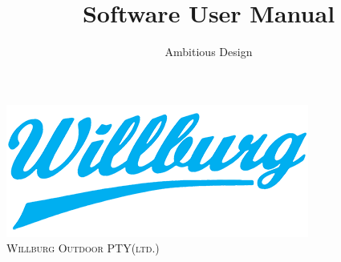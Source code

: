 \documentclass[a4paper,12pt]{report}
\author{Ambitious Design}
\title{ Software User Manual}
\begin{document}
\setlength{\parskip}{6pt}

\begin{titlepage}

\begin{center}

\includegraphics{../Images/willburg.png}\\
\textsc{\LARGE Willburg Outdoor PTY(ltd.)}\\[1.5cm]


\end{center}
\end{titlepage}
\end{document}
